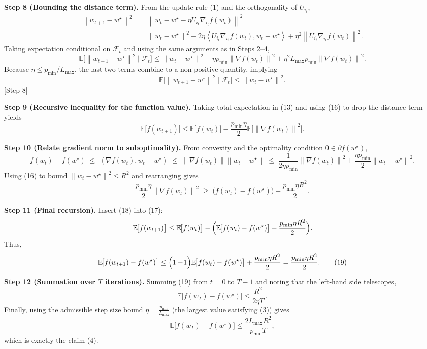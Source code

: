 \documentclass[11pt]{article}
\newcommand{\E}{\mathbb{E}}
\newcommand{\norm}[1]{\left\|#1\right\|}
\newcommand{\inner}[2]{\left\langle #1,#2 \right\rangle}
\begin{document}
\bigskip
\noindent\textbf{Step 8 (Bounding the distance term).}  
From the update rule (1) and the orthogonality of $U_{i_t}$,
\[
\begin{aligned}
\norm{w_{t+1}-w^\star}^{2}
&= \norm{w_t-w^\star -\eta U_{i_t}\nabla_{i_t}f(w_t)}^{2}                \\
&= \norm{w_t-w^\star}^{2}
   -2\eta\inner{U_{i_t}\nabla_{i_t}f(w_t)}{w_t-w^\star}
   +\eta^{2}\norm{U_{i_t}\nabla_{i_t}f(w_t)}^{2}.
\end{aligned}
\tag{14}
\]
Taking expectation conditional on $\mathcal{F}_t$ and using the same arguments as in Steps 2–4,
\[
\E\!\bigl[\norm{w_{t+1}-w^\star}^{2}\mid\mathcal{F}_t\bigr]
\le \norm{w_t-w^\star}^{2}
   -\eta p_{\min}\norm{\nabla f(w_t)}^{2}
   +\eta^{2}L_{\max}p_{\min}\norm{\nabla f(w_t)}^{2}.
\tag{15}
\]
Because $\eta\le p_{\min}/L_{\max}$, the last two terms combine to a non‑positive quantity, implying
\[
\E\!\bigl[\norm{w_{t+1}-w^\star}^{2}\mid\mathcal{F}_t\bigr]
\le \norm{w_t-w^\star}^{2}.
\tag{16}
\]
\hfill[Step 8]

\bigskip
\noindent\textbf{Step 9 (Recursive inequality for the function value).}  
Taking total expectation in (13) and using (16) to drop the distance term yields
\[
\E\!\bigl[f(w_{t+1})\bigr]
\le \E\!\bigl[f(w_t)\bigr]
      -\frac{p_{\min}\eta}{2}\E\!\bigl[\norm{\nabla f(w_t)}^{2}\bigr].
\tag{17}
\]

\bigskip
\noindent\textbf{Step 10 (Relate gradient norm to suboptimality).}  
From convexity and the optimality condition $0\in\partial f(w^\star)$,
\[
f(w_t)-f(w^\star)\;\le\;\inner{\nabla f(w_t)}{w_t-w^\star}
\;\le\;\norm{\nabla f(w_t)}\norm{w_t-w^\star}
\;\le\;\frac{1}{2\eta p_{\min}}\norm{\nabla f(w_t)}^{2}
      +\frac{\eta p_{\min}}{2}\norm{w_t-w^\star}^{2}.
\]
Using (16) to bound $\norm{w_t-w^\star}^{2}\le R^{2}$ and rearranging gives
\[
\frac{p_{\min}\eta}{2}\norm{\nabla f(w_t)}^{2}
\;\ge\; \bigl(f(w_t)-f(w^\star)\bigr)-\frac{p_{\min}\eta R^{2}}{2}.
\tag{18}
\]

\bigskip
\noindent\textbf{Step 11 (Final recursion).}  
Insert (18) into (17):
\[
\E\!\bigl[f(w_{t+1})\bigr]
\le \E\!\bigl[f(w_t)\bigr]
      -\Bigl(\E\!\bigl[f(w_t)-f(w^\star)\bigr]-\frac{p_{\min}\eta R^{2}}{2}\Bigr).
\]
Thus,
\[
\E\!\bigl[f(w_{t+1})-f(w^\star)\bigr]
\le \Bigl(1-\!1\Bigr)\E\!\bigl[f(w_t)-f(w^\star)\bigr]
      +\frac{p_{\min}\eta R^{2}}{2}
= \frac{p_{\min}\eta R^{2}}{2}.
\tag{19}
\]

\bigskip
\noindent\textbf{Step 12 (Summation over $T$ iterations).}  
Summing (19) from $t=0$ to $T-1$ and noting that the left‑hand side telescopes,
\[
\E\!\bigl[f(w_T)-f(w^\star)\bigr]
\le \frac{R^{2}}{2\eta T}\, .
\]
Finally, using the admissible step size bound $\eta = \frac{p_{\min}}{L_{\max}}$ (the largest value satisfying (3)) gives
\[
\E\!\bigl[f(w_T)-f(w^\star)\bigr]
\le \frac{2L_{\max}R^{2}}{p_{\min}T},
\]
which is exactly the claim (4). \hfill\qedsymbol
\end{document}
